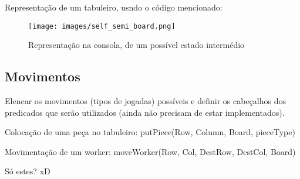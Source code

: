 \documentclass[a4paper]{article}
\begin{document}
Representação de um tabuleiro, usndo o código mencionado:\newline

\begin{figure}[h!]
\begin{center}
	\texttt{[image: images/self\_semi\_board.png]}
	\caption{Representação na consola, de um possível estado intermédio}
	\label{Figura 6}
\end{center}
\end{figure}

\newpage

\subsection{Movimentos}

Elencar os movimentos (tipos de jogadas) possíveis e definir os cabeçalhos dos predicados que serão utilizados (ainda não precisam de estar implementados).

Colocação de uma peça no tabuleiro:
	putPiece(Row, Column, Board, pieceType)

Movimentação de um worker:
	moveWorker(Row, Col, DestRow, DestCol, Board)
	
Só estes? xD
\end{document}
